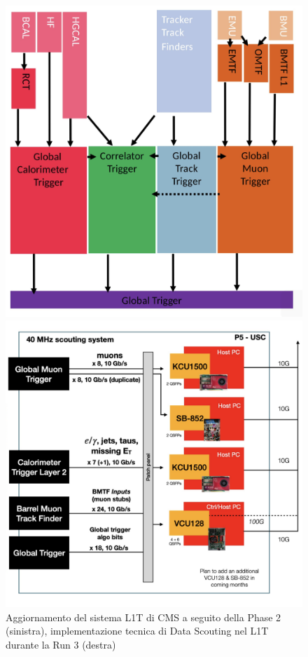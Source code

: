 \begin{figure}[t]
  \centering
  \begin{minipage}[b]{0.43\textwidth}
      \centering
      \includegraphics[width=\textwidth]{../ImmaginiTesi/Phase2.png} 
    \end{minipage}
    \hfill 
    \begin{minipage}[b]{0.48\textwidth}
      \centering
      \includegraphics[width=\textwidth]{../ImmaginiTesi/DataScoutingRun3.png} 
  \end{minipage}
  \caption{Aggiornamento del sistema L1T di CMS a seguito della Phase 2 (sinistra), implementazione tecnica di Data Scouting nel L1T durante la Run 3 (destra)}
  \label{fig:Scouting}
\end{figure}

